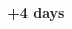 \documentclass[aspectratio=169, 10pt]{beamer}
\begin{document}
\begin{frame}
\begin{columns}
\begin{column}{0.33\textwidth}
\end{column}
\begin{column}{0.33\textwidth}

\begin{figure}
\textbf{+4 days}\vspace{.1cm}\\
\end{figure}

\end{column}
\begin{column}{0.33\textwidth}


\end{column}
\end{columns}
\end{frame}
\end{document}
